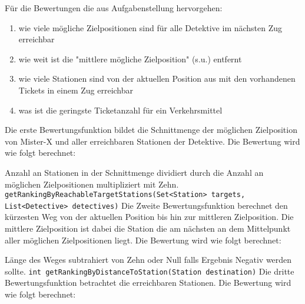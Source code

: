                    Für die Bewertungen die aus Aufgabenstellung hervorgehen:
                    \begin{enumerate}
                        \item wie viele mögliche Zielpositionen sind für alle Detektive im nächsten Zug erreichbar
                        \item wie weit ist die "mittlere mögliche Zielposition" (s.u.) entfernt 
                        \item wie viele Stationen sind von der aktuellen Position aus mit den vorhandenen Tickets in einem Zug erreichbar
                        \item was ist die geringste Ticketanzahl für ein Verkehrsmittel
                    \end{enumerate}
                    Die erste Bewertungsfunktion bildet die Schnittmenge der möglichen Zielposition von Mister-X und aller erreichbaren Stationen der Detektive.
                    Die Bewertung wird wie folgt berechnet:
                    
                    Anzahl an Stationen in der Schnittmenge dividiert durch die Anzahl an möglichen Zielpositionen multipliziert mit Zehn.
                    \newline
                    \newline
                    \texttt{getRankingByReachableTargetStations(Set<Station> targets,\\ List<Detective> detectives)}
                    \newline
                    \newline
                    Die Zweite Bewertungsfunktion berechnet den kürzesten Weg von der aktuellen Position bis hin zur mittleren Zielposition.
                    Die mittlere Zielposition ist dabei die Station die am nächsten an dem Mittelpunkt aller möglichen Zielpositionen liegt.
                    Die Bewertung wird wie folgt berechnet:

                    Länge des Weges subtrahiert von Zehn oder Null falls Ergebnis Negativ werden sollte.
                    \newline
                    \newline
                    \texttt{int getRankingByDistanceToStation(Station destination)}
                    \newline
                    \newline
                    Die dritte Bewertungsfunktion betrachtet die erreichbaren Stationen.
                    Die Bewertung wird wie folgt berechnet:

